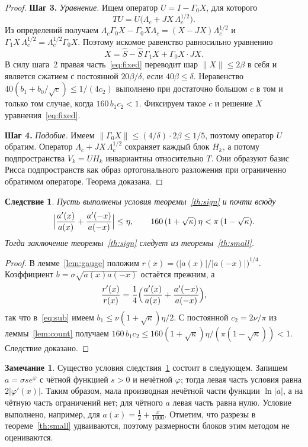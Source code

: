 \documentclass[12pt,a4paper]{article}
\newtheorem{corollary}{Следствие}
\theoremstyle{definition}
\newtheorem{remark}{Замечание}
\newcommand{\step}[1]{\smallskip\noindent\textbf{Шаг #1.}}
\newcommand{\norm}[1]{\lVert#1\rVert}
\newcommand{\abs}[1]{\lvert#1\rvert}
\begin{document}
\begin{proof}
\step{3} \emph{Уравнение.} Ищем оператор $U=I-\Gamma_0X$, для которого
\[
 TU=U\bigl(\Lambda_c+JX\,\Lambda_c^{1/2}\bigr).
\]
Из определений получаем
$\Lambda_c\Gamma_0X-\Gamma_0X\Lambda_c=(X-JX)\Lambda_c^{1/2}$ и
$\Gamma_1X\,\Lambda_c^{1/2}=\Lambda_c^{1/2}\Gamma_0X$. Поэтому искомое равенство
равносильно уравнению
\begin{equation}\label{eq:fixed}
 X=\hat S-\hat S\,\Gamma_1X+\Gamma_0X\cdot JX .
\end{equation}
В силу шага~2 правая часть~\eqref{eq:fixed} переводит шар $\norm X\le2\beta$ в себя и
является сжатием с постоянной $20\beta/\delta$, если $40\beta\le\delta$. Неравенство
$40(b_1+b_0/\sqrt c)\le1/(4c_2)$ выполнено при достаточно большом $c$ в том и только
том случае, когда $160\,b_1c_2<1$. Фиксируем такое $c$ и решение $X$
уравнения~\eqref{eq:fixed}.

\step{4} \emph{Подобие.} Имеем $\norm{\Gamma_0X}\le(4/\delta)\cdot2\beta\le1/5$, поэтому
оператор $U$ обратим. Оператор $\Lambda_c+JX\,\Lambda_c^{1/2}$ сохраняет каждый блок
$H_k$, а потому подпространства $V_k=UH_k$ инвариантны относительно $T$. Они образуют
базис Рисса подпространств как образ ортогонального разложения при ограниченно обратимом
операторе. Теорема доказана.
\end{proof}

\begin{corollary}\label{cor:near}
Пусть выполнены условия теоремы~\ref{th:sign} и почти всюду
\[
 \Bigl\lvert\frac{a'(x)}{a(x)}+\frac{a'(-x)}{a(-x)}\Bigr\rvert\le\eta,\qquad
 160\,(1+\sqrt\kappa)\,\eta<\pi\,(1-\sqrt\kappa).
\]
Тогда заключение теоремы~\ref{th:sign} следует из теоремы~\ref{th:small}.
\end{corollary}
\begin{proof}
В лемме~\ref{lem:gauge} положим $r(x)=\bigl(\abs{a(x)}/\abs{a(-x)}\bigr)^{1/4}$.
Коэффициент $b=\sigma\sqrt{a(x)a(-x)}$ остаётся прежним, а
\[
 \frac{r'(x)}{r(x)}=\frac14\Bigl(\frac{a'(x)}{a(x)}+\frac{a'(-x)}{a(-x)}\Bigr),
\]
так что в~\eqref{eq:sub} имеем $b_1\le\nu(1+\sqrt\kappa)\eta/2$. С постоянной
$c_2=2\nu/\pi$ из леммы~\ref{lem:count} получаем
$160\,b_1c_2\le160(1+\sqrt\kappa)\eta/(\pi(1-\sqrt\kappa))<1$. Следствие доказано.
\end{proof}

\begin{remark}\label{rem:near}
Существо условия следствия~\ref{cor:near} состоит в следующем. Запишем
$a=\sigma se^{\varphi}$ с чётной функцией $s>0$ и нечётной $\varphi$; тогда левая часть
условия равна $2\abs{\varphi'(x)}$. Таким образом, мала производная нечётной части
функции $\ln\abs a$, а на чётную часть ограничений нет; для чётного $a$ левая часть
равна нулю. Условие выполнено, например, для $a(x)=\tfrac12+\tfrac x{1000}$. Отметим, что
разрезы в теореме~\ref{th:small} удваиваются, поэтому размерности блоков этим методом не
оцениваются.
\end{remark}
\end{document}
